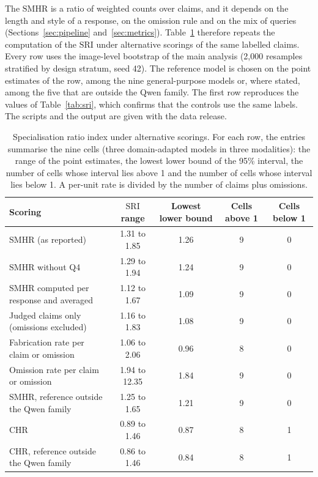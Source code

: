 \documentclass[11pt,a4paper]{article}
\newcommand{\SMHR}{\ensuremath{\mathrm{SMHR}}}
\newcommand{\CHR}{\ensuremath{\mathrm{CHR}}}
\newcommand{\SRI}{\ensuremath{\mathrm{SRI}}}
\begin{document}
The \SMHR{} is a ratio of weighted counts over claims, and it depends on the length and style of a response, on the omission rule and on the mix of queries (Sections~\ref{sec:pipeline} and~\ref{sec:metrics}). Table~\ref{tab:controls} therefore repeats the computation of the \SRI{} under alternative scorings of the same labelled claims. Every row uses the image-level bootstrap of the main analysis (2{,}000 resamples stratified by design stratum, seed 42). The reference model is chosen on the point estimates of the row, among the nine general-purpose models or, where stated, among the five that are outside the Qwen family. The first row reproduces the values of Table~\ref{tab:sri}, which confirms that the controls use the same labels. The scripts and the output are given with the data release.

\begin{table}[tbp]
\centering
\small
\caption{Specialisation ratio index under alternative scorings. For each row, the entries summarise the nine cells (three domain-adapted models in three modalities): the range of the point estimates, the lowest lower bound of the 95\% interval, the number of cells whose interval lies above 1 and the number of cells whose interval lies below 1. A per-unit rate is divided by the number of claims plus omissions.}
\label{tab:controls}
\begin{tabular}{@{}p{6.4cm}cccc@{}}
\toprule
Scoring & \SRI{} range & Lowest lower bound & Cells above 1 & Cells below 1 \\
\midrule
\SMHR{} (as reported) & 1.31 to 1.85 & 1.26 & 9 & 0 \\
\SMHR{} without Q4 & 1.29 to 1.94 & 1.24 & 9 & 0 \\
\SMHR{} computed per response and averaged & 1.12 to 1.67 & 1.09 & 9 & 0 \\
Judged claims only (omissions excluded) & 1.16 to 1.83 & 1.08 & 9 & 0 \\
Fabrication rate per claim or omission & 1.06 to 2.06 & 0.96 & 8 & 0 \\
Omission rate per claim or omission & 1.94 to 12.35 & 1.84 & 9 & 0 \\
\SMHR{}, reference outside the Qwen family & 1.25 to 1.65 & 1.21 & 9 & 0 \\
\CHR{} & 0.89 to 1.46 & 0.87 & 8 & 1 \\
\CHR{}, reference outside the Qwen family & 0.86 to 1.46 & 0.84 & 8 & 1 \\
\bottomrule
\end{tabular}
\end{table}
\end{document}
